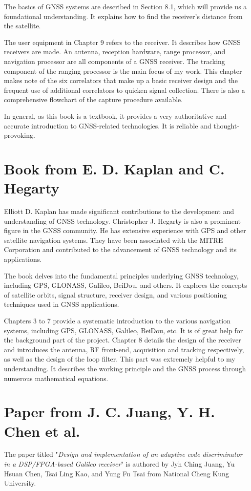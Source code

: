 The basics of GNSS systems are described in Section 8.1, which will provide us a foundational understanding. It explains how to find the receiver's distance from the satellite.

The user equipment in Chapter 9 refers to the receiver. It describes how GNSS receivers are made. An antenna, reception hardware, range processor, and navigation processor are all components of a GNSS receiver. The tracking component of the ranging processor is the main focus of my work. This chapter makes note of the six correlators that make up a basic receiver design and the frequent use of additional correlators to quicken signal collection. There is also a comprehensive flowchart of the capture procedure available.

In general, as this book is a textbook, it provides a very authoritative and accurate introduction to GNSS-related technologies. It is reliable and thought-provoking.

\section{Book from E. D. Kaplan and C. Hegarty\texorpdfstring{\cite{RN177}}{}}
Elliott D. Kaplan has made significant contributions to the development and understanding of GNSS technology. Christopher J. Hegarty is also a prominent figure in the GNSS community. He has extensive experience with GPS and other satellite navigation systems. They have been associated with the MITRE Corporation and contributed to the advancement of GNSS technology and its applications.

The book delves into the fundamental principles underlying GNSS technology, including GPS, GLONASS, Galileo, BeiDou, and others. It explores the concepts of satellite orbits, signal structure, receiver design, and various positioning techniques used in GNSS applications.

Chapters 3 to 7 provide a systematic introduction to the various navigation systems, including GPS, GLONASS, Galileo, BeiDou, etc. It is of great help for the background part of the project. Chapter 8 details the design of the receiver and introduces the antenna, RF front-end, acquisition and tracking respectively, as well as the design of the loop filter. This part was extremely helpful to my understanding. It describes the working principle and the GNSS process through numerous mathematical equations.

\section{Paper from J. C. Juang, Y. H. Chen et al.\texorpdfstring{\cite{RN147}}{}}
The paper titled "\textit{Design and implementation of an adaptive code discriminator in a DSP/FPGA-based Galileo receiver}" is authored by Jyh Ching Juang, Yu Hsuan Chen, Tsai Ling Kao, and Yung Fu Tsai from National Cheng Kung University.

